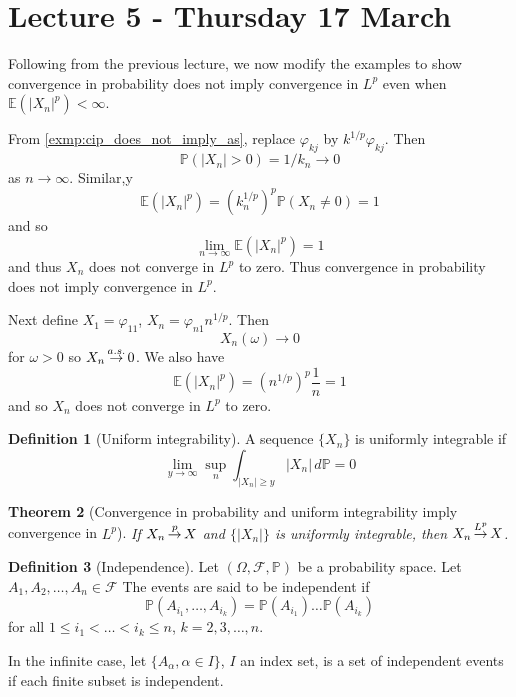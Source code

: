 \documentclass[10pt, oneside, reqno]{amsart}
\theoremstyle{plain}%
\newtheorem{thm}{Theorem}[section]
\theoremstyle{definition}
\newtheorem{defn}[thm]{Definition}
\theoremstyle{remark}
\renewcommand{\phi}{\varphi}
\newcommand{\sigf}{\mathcal{F}}
\newcommand{\E}{\mathbb{E}}
\renewcommand{\P}{\mathbb{P}}
\def\cip{\,{\buildrel p \over \rightarrow}\,}
\def\cas{\,{\buildrel a.s. \over \rightarrow}\,}
\def\clp{\,{\buildrel L^p \over \rightarrow}\,}
\begin{document}
\section{Lecture 5 - Thursday 17 March} %
\label{sec:lecture_5_thursday_17_march}

Following from the previous lecture, we now modify the examples to show convergence in probability does not imply convergence in $L^p$ even when $\E(|X_n|^p) < \infty$.

From \ref{exmp:cip_does_not_imply_as}, replace $\phi_{kj}$ by $k^{1/p} \phi_{kj}$.  Then \[
	\P(|X_n| > 0) = 1/{k_n} \rightarrow 0
\] as $n \rightarrow \infty$.  Similar,y \[
	\E(|X_n|^p) = (k_n^{1/p})^p \P(X_n \neq 0) = 1
\] and so \[
	\lim_{n \rightarrow \infty} \E(|X_n|^p) = 1
\] and thus $X_n$ does not converge in $L^p$ to zero.  Thus convergence in probability does not imply convergence in $L^p$.

Next define $X_1 = \phi_{11}$, $X_n = \phi_{n1}n^{1/p}$.  Then \[
	X_n(\omega) \rightarrow 0
\] for $\omega > 0$ so $X_n \cas 0$.  We also have \[
	\E(|X_n|^p) = (n^{1/p})^p \frac{1}{n} = 1 
\] and so $X_n$ does not converge in $L^p$ to zero.

\begin{defn}[Uniform integrability]
	A sequence $\{ X_n \}$ is uniformly integrable if \[
		\lim_{y \rightarrow \infty} \sup_{n} \int_{|X_n| \geq y} |X_n | \, d\P = 0
	\] 
	
\end{defn}


\begin{thm}[Convergence in probability and uniform integrability imply convergence in $L^p$]
	If $X_n \cip X$ and $\{ | X_n | \}$ is uniformly integrable, then $X_n \clp X$.
\end{thm}

\begin{defn}[Independence]
	Let $(\Omega, \sigf, \P)$ be a probability space.  Let $A_1, A_2, \dots, A_n \in \sigf$  The events are said to be independent if \[
		\P(A_{i_1}, \dots, A_{i_k}) = \P(A_{i_1}) \dots \P(A_{i_k})
	\] for all $1 \leq i_1 < \dots < i_k \leq n$, $k = 2, 3, \dots, n$.
	
	In the infinite case, let $\{A_{\alpha}, \alpha \in I \}$, $I$ an index set, is a set of independent events if each finite subset is independent.
	
\end{defn}
\end{document}
